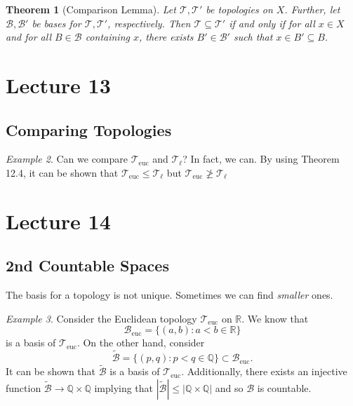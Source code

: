 \documentclass[ 12pt ]{article}
\newcounter{lecture_num}
\theoremstyle{plain}
\theoremstyle{plain}
\newtheorem{theorem}{Theorem}[lecture_num]
\theoremstyle{definition}
\theoremstyle{remark}
\newtheorem{example}[theorem]{Example}
\begin{document}
\begin{theorem}[Comparison Lemma]
	Let $\mathcal{T}, \mathcal{T}'$ be topologies on $X$. Further, let $\mathcal{B}, \mathcal{B}'$ be bases for $\mathcal{T}, \mathcal{T}'$, respectively. Then $\mathcal{T} \subseteq
	\mathcal{T}'$ if and only if for all $x \in X$ and for all $B \in \mathcal{B}$ containing $x$, there exists $B' \in \mathcal{B}'$ such that $x \in B' \subseteq B$.
\end{theorem}


\setcounter{lecture_num}{13}
\setcounter{theorem}{0}
\section*{Lecture 13}

\subsection*{Comparing Topologies}

\begin{example}
	Can we compare $\mathcal{T}_\mathrm{euc}$ and $\mathcal{T}_\ell$? In fact, we can. By using Theorem 12.4, it can be shown that $\mathcal{T}_\mathrm{euc} \leq \mathcal{T}_\ell$ but
	$\mathcal{T}_\mathrm{euc} \ngeq \mathcal{T}_\ell$
\end{example}


\setcounter{lecture_num}{14}
\setcounter{theorem}{0}
\section*{Lecture 14}

\subsection*{2nd Countable Spaces}

The basis for a topology is not unique. Sometimes we can find \textit{smaller} ones.

\begin{example}
	Consider the Euclidean topology $\mathcal{T}_\mathrm{euc}$ on $\mathbb{R}$. We know that $$\mathcal{B}_\mathrm{euc} = \{ (a, b) : a < b \in \mathbb{R} \}$$ is a basis of
	$\mathcal{T}_\mathrm{euc}$. On the other hand, consider $$\widetilde{\mathcal{B}} = \{ (p, q) : p < q \in \mathbb{Q} \} \subset \mathcal{B}_\mathrm{euc}.$$ It can be shown that
	$\widetilde{\mathcal{B}}$ is a basis of $\mathcal{T}_\mathrm{euc}$. Additionally, there exists an injective function $\widetilde{\mathcal{B}} \to \mathbb{Q} \times \mathbb{Q}$
	implying that $|\widetilde{\mathcal{B}}| \leq |\mathbb{Q} \times \mathbb{Q}|$ and so $\mathcal{\mathcal{B}}$ is countable.
\end{example}
\end{document}
